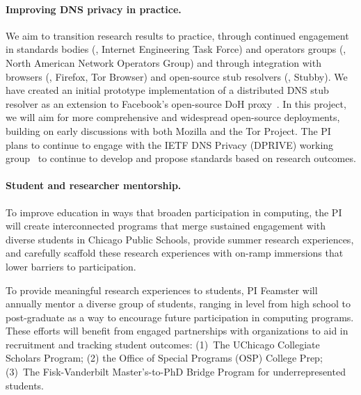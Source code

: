\paragraph{Improving DNS privacy in practice.}
We aim to transition research results to practice, through
continued engagement in standards bodies (\eg, Internet Engineering Task
Force) and operators groups (\eg, North American Network Operators Group) and
through
integration with browsers (\eg, Firefox, Tor
Browser) and open-source stub resolvers (\eg, Stubby). We have created an
initial prototype implementation of a distributed DNS stub resolver as an
extension to Facebook's open-source DoH proxy~\cite{fb-doh-proxy}. In this
project, we will aim for more comprehensive and widespread open-source
deployments, building on early discussions with both Mozilla and the Tor
Project. The PI plans to continue to engage with the IETF DNS Privacy
(DPRIVE) working group~\cite{dprive} to continue to develop and propose standards based on
research outcomes.

\paragraph{Student and researcher mentorship.} To improve education in ways
that broaden participation in computing, the PI will create interconnected
programs that merge sustained engagement with diverse students in Chicago
Public Schools, provide summer research experiences, and carefully scaffold
these research experiences with on-ramp immersions that lower barriers to
participation.

To provide meaningful research experiences to students, PI Feamster will
annually mentor a diverse group of students, ranging in level from high school
to post-graduate as a way to encourage future participation in computing
programs. These efforts will benefit from engaged partnerships with
organizations to aid in recruitment and tracking student outcomes: (1)~The
UChicago Collegiate Scholars Program; (2) the Office of Special Programs (OSP)
College Prep; (3)~The Fisk-Vanderbilt Master's-to-PhD Bridge Program for
underrepresented students.

